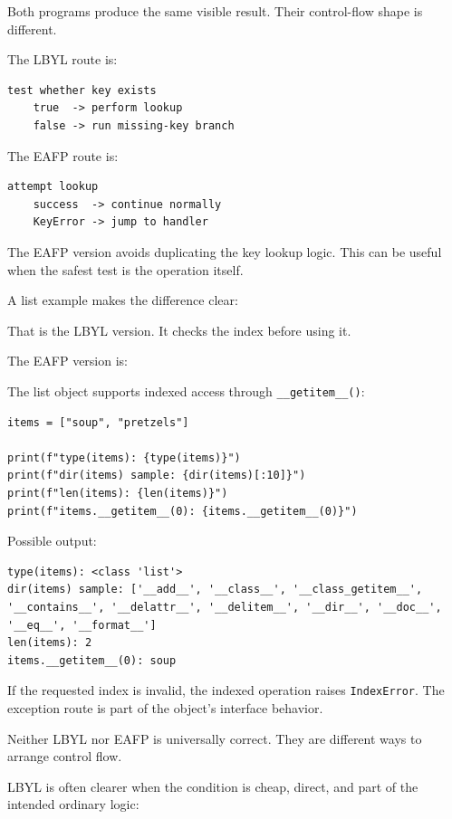 Both programs produce the same visible result. Their control-flow shape is different.

The LBYL route is:

\begin{verbatim}
test whether key exists
    true  -> perform lookup
    false -> run missing-key branch
\end{verbatim}

The EAFP route is:

\begin{verbatim}
attempt lookup
    success  -> continue normally
    KeyError -> jump to handler
\end{verbatim}

The EAFP version avoids duplicating the key lookup logic. This can be useful when the safest test is the operation itself.

A list example makes the difference clear:

That is the LBYL version. It checks the index before using it.

The EAFP version is:

The list object supports indexed access through \texttt{\_\_getitem\_\_()}:

\begin{verbatim}
items = ["soup", "pretzels"]

print(f"type(items): {type(items)}")
print(f"dir(items) sample: {dir(items)[:10]}")
print(f"len(items): {len(items)}")
print(f"items.__getitem__(0): {items.__getitem__(0)}")
\end{verbatim}

Possible output:

\begin{verbatim}
type(items): <class 'list'>
dir(items) sample: ['__add__', '__class__', '__class_getitem__',
'__contains__', '__delattr__', '__delitem__', '__dir__', '__doc__',
'__eq__', '__format__']
len(items): 2
items.__getitem__(0): soup
\end{verbatim}

If the requested index is invalid, the indexed operation raises \texttt{IndexError}. The exception route is part of the object's interface behavior.

Neither LBYL nor EAFP is universally correct. They are different ways to arrange control flow.

LBYL is often clearer when the condition is cheap, direct, and part of the intended ordinary logic:

